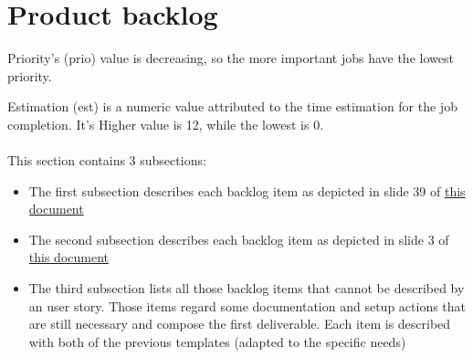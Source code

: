 \section{Product backlog} \label{product_backlog}
Priority's (prio) value is decreasing, so the more important jobs have the lowest priority.

Estimation (est) is a numeric value attributed to the time estimation for the job completion. It's Higher value is 12, while the lowest is 0.
\\ \\
This section contains 3 subsections: 
\begin{itemize}
	\item The first subsection describes each backlog item as depicted in slide 39 of \href{https://didatticaonline.unitn.it/dol/pluginfile.php/1827830/mod_resource/content/1/SW-eng-L15-Agile.pdf}{this document} 
	\item The second subsection describes each backlog item as depicted in slide 3 of \href{https://didatticaonline.unitn.it/dol/pluginfile.php/1828441/mod\_resource/content/1/SW-eng-L16-Agile-hands-on.pdf}{this document}
	\item The third subsection lists all those backlog items that cannot be described by an user story. Those items regard some documentation and setup actions that are still necessary and compose the first deliverable. Each item is described with both of the previous templates (adapted to the specific needs)
\end{itemize}

\newpage
